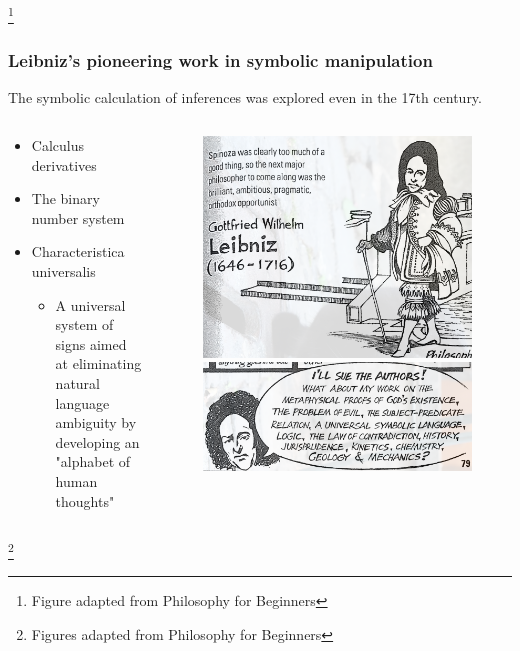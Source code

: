 \documentclass[unicode, 14pt, aspectratio=169]{beamer}
\newcommand\blfootnote[1]{%
  \begingroup
  \renewcommand\thefootnote{}\footnote{#1}%
  \addtocounter{footnote}{-1}%
  \endgroup
}
\begin{document}
\begin{frame}
\begin{columns}
\begin{column}{0.2\textwidth}
\begin{figure}
      \end{figure}       
    \end{column} 
  \end{columns}
  \blfootnote{Figure adapted from Philosophy for Beginners\supercite{philosophy-for-begginers}}
\end{frame}

\begin{frame}
  \frametitle{Leibniz's pioneering work in symbolic manipulation}
  {\large The symbolic calculation of inferences was explored even in the 17th century.}
  \begin{columns}
    \begin{column}{0.55\textwidth}
      {\setlength{\leftmargini}{0.05\paperwidth}
       \setlength{\leftmarginii}{16pt}
      \begin{itemize}
        \item Calculus derivatives
        \item The binary number system
        \item Characteristica universalis
          \begin{itemize}
          \item A universal system of signs aimed at eliminating natural language ambiguity by developing an "alphabet of human thoughts"
          \end{itemize}
        \end{itemize}
      }
    \end{column}    
    \begin{column}{0.4\textwidth}
      \begin{figure}
        \includegraphics[width=0.65\linewidth]{images/leibniz.png}
        \includegraphics[width=0.65\linewidth]{images/universal.png}
      \end{figure}
    \end{column} 
  \end{columns}
  \blfootnote{Figures adapted from Philosophy for Beginners\supercite{philosophy-for-begginers}}  
\end{frame}
\end{document}
